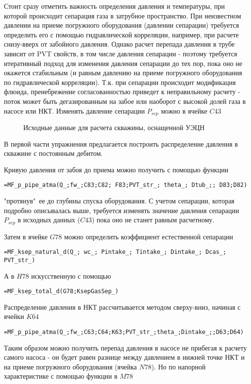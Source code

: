 Стоит сразу отметить важность определения давления и температуры, при которой происходит сепарация газа в затрубное пространство. При неизвестном давлении на приеме погружного оборудования (давлении сепарации) требуется определить его с помощью гидравлической корреляции, например, при расчете снизу-вверх от забойного давления. Однако расчет перепада давления в трубе зависит от PVT свойств, в том числе давления сепарации - поэтому требуется итеративный подход для изменения давления сепарации до тех пор, пока оно не окажется стабильным (и равным давлению на приеме погружного оборудования по гидравлической корреляции). Т.к. при сепарации происходит модификация флюида, пренебрежение согласованностью приведет к неправильному расчету - поток может быть дегазированным на забое или наоборот с высокой долей газа в насосе или НКТ. Изменять давление сепарации $P_{sep}$ можно в ячейке $C43$

\begin{figure}[h!]
	\center{\texttt{[image: Ex100\_1]}}
	\caption{Исходные данные для расчета скважины, оснащенной УЭЦН}
	\label{ris:Ex100_1}
\end{figure}

В первой части упражнения предлагается построить распределение давления в скважине с постоянным дебитом. 

Кривую давления от забоя до приема можно получить с помощью функции

{ \small  \texttt{=MF\_p\_pipe\_atma(Q\_;fw\_;C83;C82; F83;PVT\_str\_; theta\_; Dtub\_;; D83;D82)
}}

"протянув"\ ее до глубины спуска оборудования. С учетом сепарации, которая подробно описывалась выше, требуется изменять значение давления сепарации $P_{sep}$ в исходных данных ($C43$) пока оно не станет равным расчетному.

Затем в ячейке $G78$ можно определить коэффициент естественной сепарации

{ \small  \texttt{=MF\_ksep\_natural\_d(Q\_; wc\_; Pintake\_; Tintake\_; Dintake\_; Dcas\_; PVT\_str\_)
}}

А в $H78$ искусственную с помощью 

{ \small  \texttt{=MF\_ksep\_total\_d(G78;KsepGasSep\_)
}}

Распределение давления в НКТ рассчитывается методом сверху-вниз, начиная с ячейки $K64$

{ \small  \texttt{=MF\_p\_pipe\_atma(Q\_;fw\_;C63;C64;K63;PVT\_str\_;theta\_;Dintake\_;;D63;D64)
}}

Таким образом можно получить перепад давления в насосе не прибегая к расчету самого насоса - он будет равен разнице между давлением в нижней точке НКТ и на приеме погружного оборудования (ячейка $N78$). Но по напорной характеристике с помощью функции в $M78$

